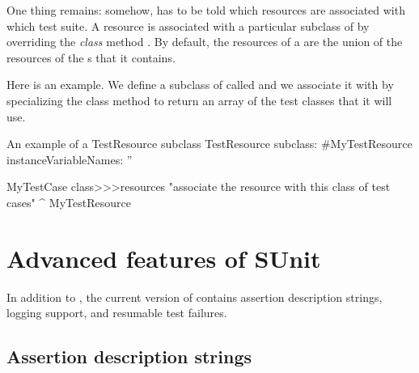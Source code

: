 \documentclass[a4paper,10pt,twoside]{book}
\begin{document}
One thing remains: somehow, \sunit has to be told which resources are associated with which test suite.
A resource is associated
with a particular subclass of  
by overriding the \emph{class} method .
By default, the resources of 
a  are
the union of the resources of
the s that it contains.

Here is an example. 
We define a subclass of  called
 and we associate it with 
by specializing the class method  to return an array
of the test classes that it will use.

\begin{classdef}[mytestresource]{An example of a TestResource subclass}
TestResource subclass: #MyTestResource
	instanceVariableNames: ''

MyTestCase class>>>resources
	"associate the resource with this class of test cases"
	^{ MyTestResource }
\end{classdef}






\section{Advanced features of SUnit}
In addition to , the current version of \sunit contains assertion
description strings, logging support, and resumable test failures.

\subsection{Assertion description strings}
\end{document}
